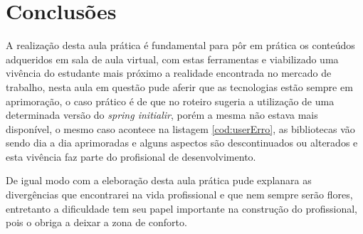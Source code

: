 \section{Conclusões}
\par A realização desta aula prática é fundamental para pôr em prática os conteúdos adqueridos em sala de aula virtual, com estas ferramentas e viabilizado uma vivência do estudante mais próximo a realidade encontrada no mercado de trabalho, nesta aula em questão pude aferir que as tecnologias estão sempre em aprimoração, o caso prático é de que no roteiro sugeria a utilização de uma determinada versão do \textit{spring initialir}, porém a mesma não estava mais disponível, o mesmo caso acontece na listagem \ref{cod:userErro}, as bibliotecas vão sendo dia a dia aprimoradas e alguns aspectos são descontinuados ou alterados e esta vivência faz parte do profisional de desenvolvimento.
\par De igual modo com a eleboração desta aula prática pude explanara as divergências que encontrarei na vida profissional e que nem sempre serão flores, entretanto a dificuldade tem seu papel importante na construção do profissional, pois o obriga a deixar a zona de conforto.

